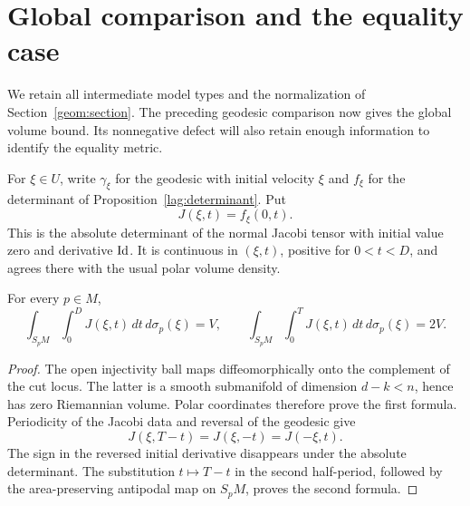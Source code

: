 \section{Global comparison and the equality case}
\label{rig:section}

We retain all intermediate model types and the normalization of
Section~\ref{geom:section}. The preceding geodesic comparison
now gives the global volume bound. Its nonnegative defect will
also retain enough information to identify the equality metric.

For $\xi\in U$, write $\gamma_\xi$ for the geodesic with initial
velocity $\xi$ and $f_\xi$ for the determinant of
Proposition~\ref{lag:determinant}. Put
\[
 J(\xi,t)=f_\xi(0,t).
\]
This is the absolute determinant of the normal Jacobi tensor
with initial value zero and derivative $\mathrm{Id}$. It is continuous
in $(\xi,t)$, positive for $0<t<D$, and agrees there with the
usual polar volume density.

\begin{lemma}
\label{rig:polar}
For every $p\in M$,
\[
 \int_{S_pM}\int_0^D J(\xi,t)\,dt\,d\sigma_p(\xi)=V,
 \qquad
 \int_{S_pM}\int_0^T J(\xi,t)\,dt\,d\sigma_p(\xi)=2V.
\]
\end{lemma}

\begin{proof}
The open injectivity ball maps diffeomorphically onto the
complement of the cut locus. The latter is a smooth submanifold
of dimension $d-k<n$, hence has zero Riemannian volume.
Polar coordinates therefore prove the first formula.
Periodicity of the Jacobi data and reversal of the geodesic give
\[
 J(\xi,T-t)=J(\xi,-t)=J(-\xi,t).
\]
The sign in the reversed initial derivative disappears under the
absolute determinant. The substitution $t\mapsto T-t$ in the
second half-period, followed by the area-preserving antipodal
map on $S_pM$, proves the second formula.
\end{proof}

